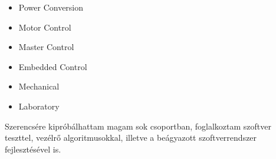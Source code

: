 \begin{itemize}
	\item{Power Conversion}
	\item{Motor Control}
	\item{Master Control}
	\item{Embedded Control}
	\item{Mechanical}
	\item{Laboratory} 
\end{itemize}

Szerencsére kipróbálhattam magam sok csoportban, foglalkoztam szoftver teszttel, vezélrő algoritmusokkal, illetve a beágyazott szoftverrendszer fejlesztésével is. 



